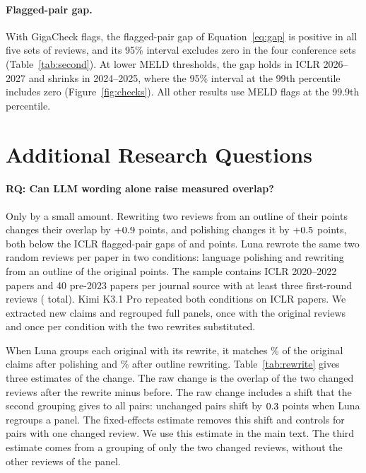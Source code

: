 \documentclass[11pt]{article}
\newcounter{rq}
\newcommand{\question}[2]{\refstepcounter{rq}\paragraph{RQ\therq: #2}\label{#1}}
\begin{document}
\paragraph{Flagged-pair gap.}
With GigaCheck flags, the flagged-pair gap of Equation~\ref{eq:gap} is positive in all five sets of reviews, and its 95\% interval excludes zero in the four conference sets (Table~\ref{tab:second}). At lower MELD thresholds, the gap holds in ICLR 2026--2027 and shrinks in 2024--2025, where the 95\% interval at the 99th percentile includes zero (Figure~\ref{fig:checks}). All other results use MELD flags at the 99.9th percentile.

\begin{table}[!htp]
\centering\footnotesize

\caption{The flagged-pair gap is positive with the flags of either detector. Each gap is the overlap of two flagged reviews minus the overlap of two unflagged reviews of one paper (Equation~\ref{eq:gap}), in points, with its 95\% interval from the SE over papers. Papers: papers with both pair types. Pairs: two-flagged and unflagged pairs of these papers. The journal row pools the five sources.}
\label{tab:second}
\end{table}


\section{Additional Research Questions}
\label{app:robust}

\question{app:rewrite}{Can LLM wording alone raise measured overlap?}
Only by a small amount. Rewriting two reviews from an outline of their points changes their overlap by $+0.9$ points, and polishing changes it by $+0.5$ points, both below the ICLR flagged-pair gaps of \FlagGapEarly{} and \FlagGapLate{} points. Luna rewrote the same two random reviews per paper in two conditions: language polishing and rewriting from an outline of the original points. The sample contains \RwIclrPapers{} ICLR 2020--2022 papers and 40 pre-2023 papers per journal source with at least three first-round reviews (\RwPapers{} total). Kimi K3.1 Pro repeated both conditions on \RkIclrPapers{} ICLR papers. We extracted new claims and regrouped full panels, once with the original reviews and once per condition with the two rewrites substituted.

When Luna groups each original with its rewrite, it matches \PlLunaRecall\% of the original claims after polishing and \RwLunaRecall\% after outline rewriting. Table~\ref{tab:rewrite} gives three estimates of the change. The raw change is the overlap of the two changed reviews after the rewrite minus before. The raw change includes a shift that the second grouping gives to all pairs: unchanged pairs shift by $0.3$ points when Luna regroups a panel. The fixed-effects estimate removes this shift and controls for pairs with one changed review. We use this estimate in the main text. The third estimate comes from a grouping of only the two changed reviews, without the other reviews of the panel.
\end{document}
